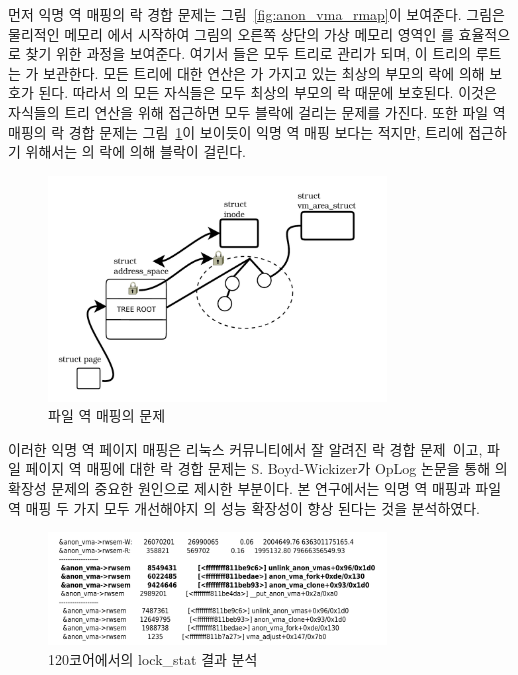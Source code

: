 먼저 익명 역 매핑의 락 경합 문제는 그림~\ref{fig:anon_vma_rmap}이 보여준다.
그림은 물리적인 메모리 에서 시작하여 그림의 오른쪽 상단의 
가상 메모리 영역인 를 효율적으로 찾기 위한 과정을 보여준다. 
여기서 들은 모두 트리로 관리가 되며, 이 트리의 루트는
가 보관한다. 
모든 트리에 대한 연산은 가 가지고 있는 최상의 부모의 락에 의해 보호가 된다. 
따라서 의 모든 자식들은 모두 최상의 부모의 락 때문에 보호된다.
이것은 자식들의 트리 연산을 위해 접근하면 모두 블락에 걸리는 문제를 가진다. 
또한 파일 역 매핑의 락 경합 문제는 그림~\ref{fig:file_rmap_default}이 보이듯이 
익명 역 매핑 보다는 적지만, 트리에 접근하기 위해서는 의 락에 의해 
블락이 걸린다.

\begin{figure}[h]
    \centering
    \includegraphics[width=0.8\textwidth]{fig/file_rmap_default}
    \caption{파일 역 매핑의 문제}
  \label{fig:file_rmap_default}
\end{figure}

이러한 익명 역 페이지 매핑은 리눅스 커뮤니티에서 잘 알려진 락 경합 문제~\cite{Andi2011adding}이고, 
파일 페이지 역 매핑에 대한 락 경합 문제는 S. Boyd-Wickizer가 OpLog 논문을 통해 의 확장성 
문제의 중요한 원인으로 제시한 부분이다.
본 연구에서는 익명 역 매핑과 파일 역 매핑 두 가지 모두 개선해야지 의 성능 확장성이 
향상 된다는 것을 분석하였다. 

\begin{figure}[h]
    \centering
    \includegraphics[width=0.8\textwidth]{fig/anon_vma_func}
    \caption{120코어에서의 lock\_stat 결과 분석}
  \label{fig:anon_vma_func}
\end{figure}

